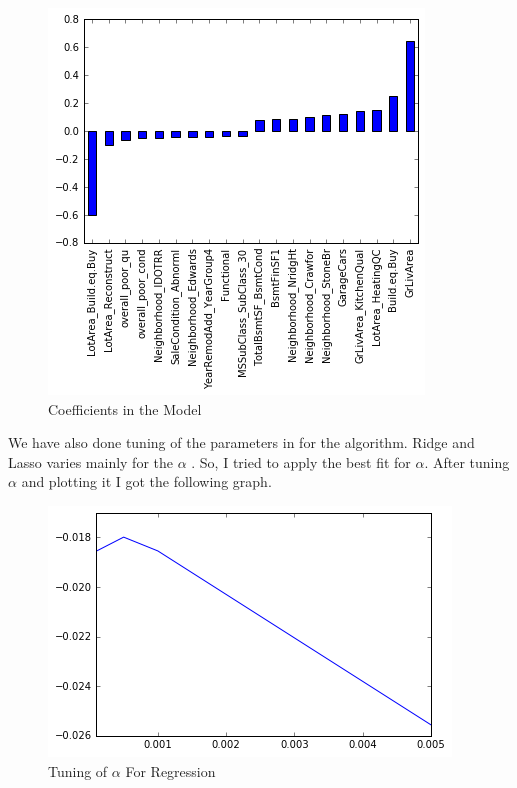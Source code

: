 \documentclass[fleqn,10pt]{SelfArx} %
\begin{document}
\begin{figure}[ht]\centering %
\includegraphics[width=\linewidth]{Figure1}
\caption{Coefficients in the Model}
\label{fig:Figure1}
\end{figure}
We have also done tuning of the parameters in for the algorithm. Ridge and Lasso varies mainly for the $\alpha$ . So, I tried to apply the best fit for $\alpha$.
After tuning $\alpha$ and plotting it I got the following graph.
\begin{figure}[ht]\centering %
\includegraphics[width=\linewidth]{Figure5}
\caption{Tuning of $\alpha$ For Regression }
\label{fig:Figure5}
\end{figure}
\end{document}
